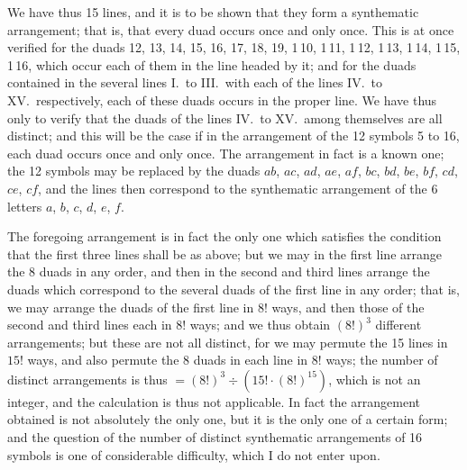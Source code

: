 \documentclass[11pt,a4paper,english]{article}
\theoremstyle{plain}
\begin{document}
We have thus 15 lines, and it is to be shown that they form a synthematic arrangement; that is, that every duad occurs once and only once. This is at once verified for the duads 12, 13, 14, 15, 16, 17, 18, 19, 1\,10, 1\,11, 1\,12, 1\,13, 1\,14, 1\,15, 1\,16, which occur each of them in the line headed by it; and for the duads contained in the several lines I.\ to III.\ with each of the lines IV.\ to XV.\ respectively, each of these duads occurs in the proper line. We have thus only to verify that the duads of the lines IV.\ to XV.\ among themselves are all distinct; and this will be the case if in the arrangement of the 12 symbols 5 to 16, each duad occurs once and only once. The arrangement in fact is a known one; the 12 symbols may be replaced by the duads $ab$, $ac$, $ad$, $ae$, $af$, $bc$, $bd$, $be$, $bf$, $cd$, $ce$, $cf$, and the lines then correspond to the synthematic arrangement of the 6 letters $a$, $b$, $c$, $d$, $e$, $f$.

The foregoing arrangement is in fact the only one which satisfies the condition that the first three lines shall be as above; but we may in the first line arrange the 8 duads in any order, and then in the second and third lines arrange the duads which correspond to the several duads of the first line in any order; that is, we may arrange the duads of the first line in $8!$ ways, and then those of the second and third lines each in $8!$ ways; and we thus obtain $(8!)^3$ different arrangements; but these are not all distinct, for we may permute the 15 lines in $15!$ ways, and also permute the 8 duads in each line in $8!$ ways; the number of distinct arrangements is thus $= (8!)^3 \div (15! \cdot (8!)^{15})$, which is not an integer, and the calculation is thus not applicable. In fact the arrangement obtained is not absolutely the only one, but it is the only one of a certain form; and the question of the number of distinct synthematic arrangements of 16 symbols is one of considerable difficulty, which I do not enter upon.
\end{document}
